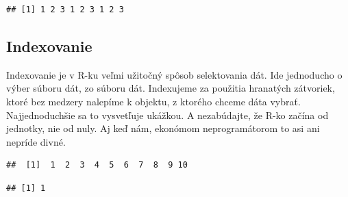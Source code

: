\begin{verbatim}
## [1] 1 2 3 1 2 3 1 2 3
\end{verbatim}

\hypertarget{indexovanie}{%
\subsection{Indexovanie}\label{indexovanie}}

Indexovanie je v R-ku veľmi užitočný spôsob selektovania dát. Ide
jednoducho o výber súboru dát, zo súboru dát. Indexujeme za použitia
hranatých zátvoriek, ktoré bez medzery nalepíme k objektu, z ktorého
chceme dáta vybrať. Najjednoduchšie sa to vysvetľuje ukážkou. A
nezabúdajte, že R-ko začína od jednotky, nie od nuly. Aj keď nám,
ekonómom neprogramátorom to asi ani nepríde divné.

\begin{Shaded}
\begin{Highlighting}[]

\StringTok{ }\NormalTok{(}\OperatorTok{:}\NormalTok{)}

\end{Highlighting}
\end{Shaded}

\begin{verbatim}
##  [1]  1  2  3  4  5  6  7  8  9 10
\end{verbatim}

\begin{Shaded}
\begin{Highlighting}[]

\NormalTok{obycajny_vektor[}\NormalTok{]}
\end{Highlighting}
\end{Shaded}

\begin{verbatim}
## [1] 1
\end{verbatim}

\begin{Shaded}
\begin{Highlighting}[]

\NormalTok{obycajny_vektor[}\NormalTok{(}\NormalTok{, }\NormalTok{)]}
\end{Highlighting}
\end{Shaded}

